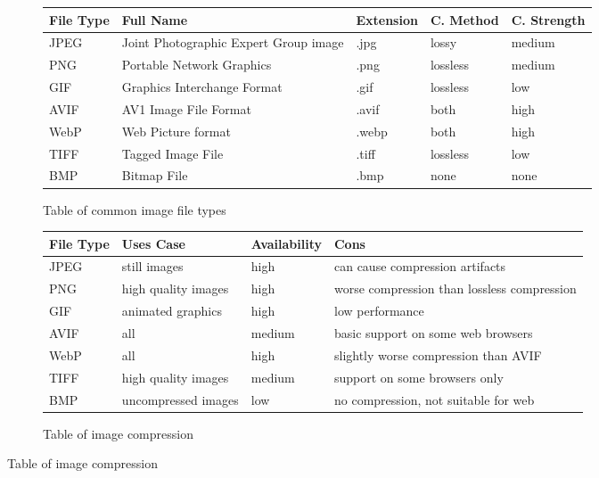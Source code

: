 \documentclass{article}
\begin{document}
\begin{figure}[h]
\begin{subfigure}{\textwidth}
\begin{tabular}{l l l l l}
\toprule
File Type & Full Name                             & Extension & C. Method & C. Strength \\
\midrule
JPEG      & Joint Photographic Expert Group image & .jpg      & lossy     & medium \\
PNG       & Portable Network Graphics             & .png      & lossless  & medium \\
GIF       & Graphics Interchange Format           & .gif      & lossless  & low \\
AVIF      & AV1 Image File Format                 & .avif     & both      & high \\
WebP      & Web Picture format                    & .webp     & both      & high \\
TIFF      & Tagged Image File                     & .tiff     & lossless  & low \\
BMP       & Bitmap File                           & .bmp      & none      & none \\
\bottomrule
\end{tabular}
\caption{Table of common image file types}
\end{subfigure}

\begin{subfigure}{\textwidth}
\centering
\begin{tabular}{l l l l}
\toprule
File Type & Uses Case           & Availability & Cons \\
\midrule
JPEG      & still images        & high         & can cause compression artifacts              \\
PNG       & high quality images & high         & worse compression than lossless compression  \\
GIF       & animated graphics   & high         & low performance                              \\
AVIF      & all                 & medium       & basic support on some web browsers           \\
WebP      & all                 & high         & slightly worse compression than AVIF         \\
TIFF      & high quality images & medium       & support on some browsers only                \\
BMP       & uncompressed images & low          & no compression, not suitable for web         \\
\bottomrule
\end{tabular}
\caption{Table of image compression}
\end{subfigure}
\end{figure}
\end{document}
